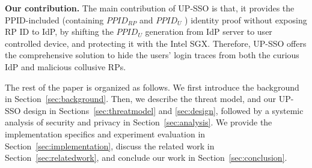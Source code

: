 

\begin{comment}
We summarize our contributions as follows.
\begin{itemize}
\item We propose the comprehensive solution to hide the users' login traces from both the curious IdP and malicious collusive RPs for convenient SSO system.
\item We formally analyze the security of XXX and show that it guarantees the security, while the users' login traces are well protected.
\item We have implemented a prototype of XXX, and compare the performance of the UP-SSO prototype with the state-of-the-art SSO systems (e.g., OIDC), and demonstrate its efficiency.
\end{itemize}
\end{comment}

\vspace{1mm}\noindent\textbf{Our contribution. }The main contribution of UP-SSO is that, it provides the PPID-included (containing $PPID_{RP}$ and $PPID_U$ ) identity proof without exposing RP ID to IdP, by shifting the $PPID_U$ generation from IdP server to user controlled device, and protecting it with the Intel SGX.
Therefore, UP-SSO offers the comprehensive solution to hide the users' login traces from both the curious IdP and malicious collusive RPs. 

The rest of the paper is organized as follows. We first introduce the background in Section~\ref{sec:background}. Then, we describe the threat model, and our UP-SSO design in Sections~\ref{sec:threatmodel} and \ref{sec:design}, followed by a systemic analysis of security and privacy in Section~\ref{sec:analysis}. We provide the implementation specifics and experiment evaluation in Section~\ref{sec:implementation},  discuss the related work in Section~\ref{sec:relatedwork}, and conclude our work in Section~\ref{sec:conclusion}.

